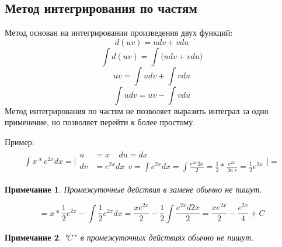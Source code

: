 \documentclass[12pt,a4paper]{article}
\newtheorem*{remark}{Примечание}
\begin{document}
\subsection{Метод интегрирования по частям}
Метод основан на интегрировании произведения двух функций:
\[
    d(uv) = udv + vdu
\]
\[
\int d(uv) = \int \big( udv + vdu \big)
\]
\[
uv = \int udv + \int vdu
\]
\begin{equation}
\int udv = uv - \int vdu
\end{equation}\label{eq_1}
Метод интегрирования по частям не позволяет выразить интеграл за
одно применение, но позволяет перейти к более простому.

Пример:
\begin{align*}
\int x * e^{2x} dx = \Bigg|
\begin{split}
u & = x\ \ \ \ \ du = dx \\
dv & = e^{2x} dx \ \ v = \int e^{2x} dx =
\int \frac{e^{2x} 2x}{2} = \frac{1}{2} * \frac{e^{2x}}{ \ln e} =
\frac{1}{2}e^{2x}
\end{split}
\Bigg| =
\end{align*}
\begin{remark}
Промежуточные действия в замене обычно не пишут.
\end{remark}
\[
= x * \frac{1}{2} e^{2x} - \int \frac{1}{2} e^{2x} dx =
\frac{x e^{2x}}{2} - \frac{1}{2} \int \frac{e^{2x} d2x}{2} =
\frac{xe^{2x}}{2} - \frac{e^{2x}}{4} + C
\]
\begin{remark}
"$C$"\ в промежуточных действиях обычно не пишут.
\end{remark}
\end{document}
